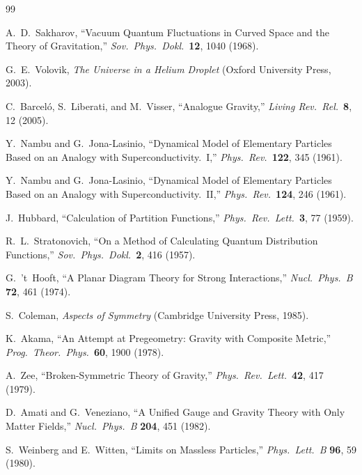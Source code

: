\documentclass[11pt,a4paper]{article}
\begin{document}
\begin{thebibliography}{99}

A.~D.~Sakharov,
``Vacuum Quantum Fluctuations in Curved Space and the Theory of
Gravitation,''
\textit{Sov.\ Phys.\ Dokl.}\ \textbf{12}, 1040 (1968).

G.~E.~Volovik,
\textit{The Universe in a Helium Droplet}
(Oxford University Press, 2003).

C.~Barcel\'{o}, S.~Liberati, and M.~Visser,
``Analogue Gravity,''
\textit{Living Rev.\ Rel.}\ \textbf{8}, 12 (2005).

Y.~Nambu and G.~Jona-Lasinio,
``Dynamical Model of Elementary Particles Based on an Analogy
with Superconductivity.\ I,''
\textit{Phys.\ Rev.}\ \textbf{122}, 345 (1961).

Y.~Nambu and G.~Jona-Lasinio,
``Dynamical Model of Elementary Particles Based on an Analogy
with Superconductivity.\ II,''
\textit{Phys.\ Rev.}\ \textbf{124}, 246 (1961).

J.~Hubbard,
``Calculation of Partition Functions,''
\textit{Phys.\ Rev.\ Lett.}\ \textbf{3}, 77 (1959).

R.~L.~Stratonovich,
``On a Method of Calculating Quantum Distribution Functions,''
\textit{Sov.\ Phys.\ Dokl.}\ \textbf{2}, 416 (1957).

G.~'t~Hooft,
``A Planar Diagram Theory for Strong Interactions,''
\textit{Nucl.\ Phys.\ B} \textbf{72}, 461 (1974).

S.~Coleman,
\textit{Aspects of Symmetry}
(Cambridge University Press, 1985).

K.~Akama,
``An Attempt at Pregeometry: Gravity with Composite Metric,''
\textit{Prog.\ Theor.\ Phys.}\ \textbf{60}, 1900 (1978).

A.~Zee,
``Broken-Symmetric Theory of Gravity,''
\textit{Phys.\ Rev.\ Lett.}\ \textbf{42}, 417 (1979).

D.~Amati and G.~Veneziano,
``A Unified Gauge and Gravity Theory with Only Matter Fields,''
\textit{Nucl.\ Phys.\ B} \textbf{204}, 451 (1982).

S.~Weinberg and E.~Witten,
``Limits on Massless Particles,''
\textit{Phys.\ Lett.\ B} \textbf{96}, 59 (1980).


\end{thebibliography}
\end{document}
